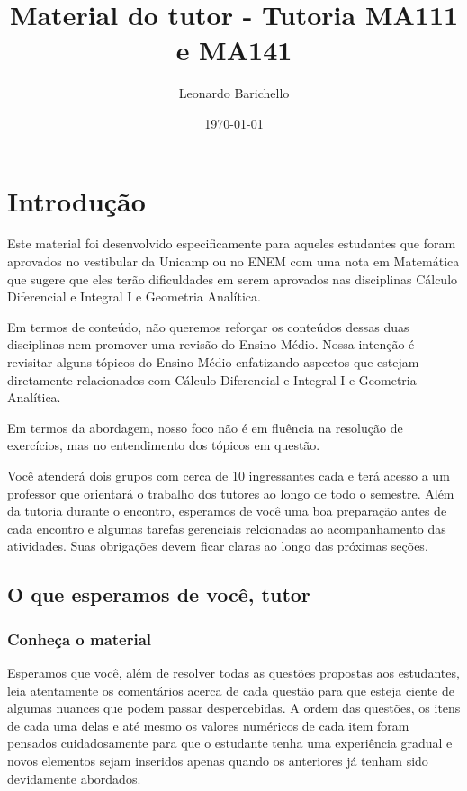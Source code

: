 \documentclass[openany]{book}
\title{Material do tutor - Tutoria MA111 e MA141}
\author{Leonardo Barichello}
\date{\today}
\begin{document}
 
\maketitle

\chapter{Introdução}

Este material foi desenvolvido especificamente para aqueles estudantes que foram aprovados no vestibular da Unicamp ou no ENEM com uma nota em Matemática que sugere que eles terão dificuldades em serem aprovados nas disciplinas Cálculo Diferencial e Integral I e Geometria Analítica.

Em termos de conteúdo, não queremos reforçar os conteúdos dessas duas disciplinas nem promover uma revisão do Ensino Médio. Nossa intenção é revisitar alguns tópicos do Ensino Médio enfatizando aspectos que estejam diretamente relacionados com Cálculo Diferencial e Integral I e Geometria Analítica.

Em termos da abordagem, nosso foco não é em fluência na resolução de exercícios, mas no entendimento dos tópicos em questão.

Você atenderá dois grupos com cerca de 10 ingressantes cada e terá acesso a um professor que orientará o trabalho dos tutores ao longo de todo o semestre. Além da tutoria durante o encontro, esperamos de você uma boa preparação antes de cada encontro e algumas tarefas gerenciais relcionadas ao acompanhamento das atividades. Suas obrigações devem ficar claras ao longo das próximas seções.

\section{O que esperamos de você, tutor}

\subsection{Conheça o material}

Esperamos que você, além de resolver todas as questões propostas aos estudantes, leia atentamente os comentários acerca de cada questão para que esteja ciente de algumas nuances que podem passar despercebidas. A ordem das questões, os itens de cada uma delas e até mesmo os valores numéricos de cada item foram pensados cuidadosamente para que o estudante tenha uma experiência gradual e novos elementos sejam inseridos apenas quando os anteriores já tenham sido devidamente abordados.
\end{document}

